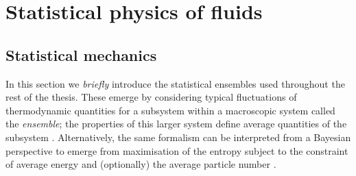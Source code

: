 \section{Statistical physics of fluids}
\label{sec:liquid-state-theory}

\subsection{Statistical mechanics}
\label{sec:stat-mech}

In this section we \emph{briefly} introduce the statistical ensembles used throughout the rest of the thesis.
These emerge by considering typical fluctuations of thermodynamic quantities for a subsystem within a macroscopic system called the \emph{ensemble}; the properties of this larger system define average quantities of the subsystem \cite{Landau2008}.
Alternatively, the same formalism can be interpreted from a Bayesian perspective to emerge from maximisation of the entropy%
subject to the constraint of average energy and (optionally) the average particle number \cite{JaynesPR1957,JaynesPR1957a}.

